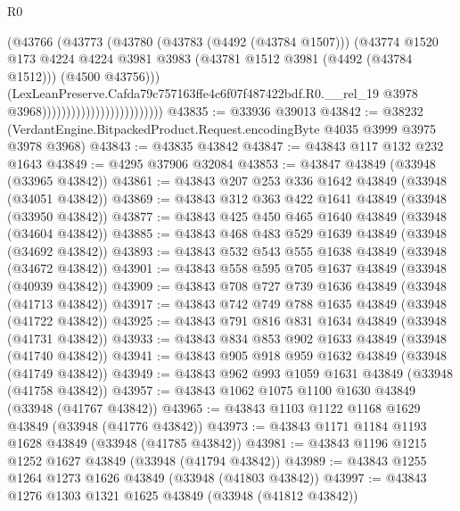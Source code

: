 \begin{lexlean}{R0}
\begin{coremodule}
                                                (@43766
                                                  (@43773
                                                    (@43780
                                                      (@43783 (@4492 (@43784 @1507)))
                                                      (@43774
                                                        @1520
                                                        @173
                                                        @4224
                                                        @4224
                                                        @3981
                                                        @3983
                                                        (@43781 @1512 @3981 (@4492 (@43784 @1512)))
                                                        (@4500 @43756)))
                                                    (LexLeanPreserve.Cafda79c757163ffe4c6f07f487422bdf.R0.__rel_19
                                                      @3978
                                                      @3968)))))))))))))))))))))))))
@43835 := @33936 @39013
@43842 := @38232 (VerdantEngine.BitpackedProduct.Request.encodingByte @4035 @3999 @3975 @3978 @3968)
@43843 := @43835 @43842
@43847 := @43843 @117 @132 @232 @1643
@43849 := @4295 @37906 @32084
@43853 := @43847 @43849 (@33948 (@33965 @43842))
@43861 := @43843 @207 @253 @336 @1642 @43849 (@33948 (@34051 @43842))
@43869 := @43843 @312 @363 @422 @1641 @43849 (@33948 (@33950 @43842))
@43877 := @43843 @425 @450 @465 @1640 @43849 (@33948 (@34604 @43842))
@43885 := @43843 @468 @483 @529 @1639 @43849 (@33948 (@34692 @43842))
@43893 := @43843 @532 @543 @555 @1638 @43849 (@33948 (@34672 @43842))
@43901 := @43843 @558 @595 @705 @1637 @43849 (@33948 (@40939 @43842))
@43909 := @43843 @708 @727 @739 @1636 @43849 (@33948 (@41713 @43842))
@43917 := @43843 @742 @749 @788 @1635 @43849 (@33948 (@41722 @43842))
@43925 := @43843 @791 @816 @831 @1634 @43849 (@33948 (@41731 @43842))
@43933 := @43843 @834 @853 @902 @1633 @43849 (@33948 (@41740 @43842))
@43941 := @43843 @905 @918 @959 @1632 @43849 (@33948 (@41749 @43842))
@43949 := @43843 @962 @993 @1059 @1631 @43849 (@33948 (@41758 @43842))
@43957 := @43843 @1062 @1075 @1100 @1630 @43849 (@33948 (@41767 @43842))
@43965 := @43843 @1103 @1122 @1168 @1629 @43849 (@33948 (@41776 @43842))
@43973 := @43843 @1171 @1184 @1193 @1628 @43849 (@33948 (@41785 @43842))
@43981 := @43843 @1196 @1215 @1252 @1627 @43849 (@33948 (@41794 @43842))
@43989 := @43843 @1255 @1264 @1273 @1626 @43849 (@33948 (@41803 @43842))
@43997 := @43843 @1276 @1303 @1321 @1625 @43849 (@33948 (@41812 @43842))

\end{coremodule}
\end{lexlean}
